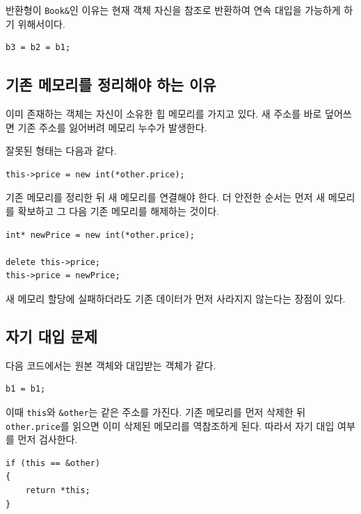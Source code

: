 \documentclass[11pt,a4paper]{article}
\begin{document}
반환형이 \texttt{Book\&}인 이유는 현재 객체 자신을 참조로 반환하여 연속 대입을 가능하게 하기 위해서이다.

\begin{lstlisting}
b3 = b2 = b1;
\end{lstlisting}

\subsection{기존 메모리를 정리해야 하는 이유}
이미 존재하는 객체는 자신이 소유한 힙 메모리를 가지고 있다. 새 주소를 바로 덮어쓰면 기존 주소를 잃어버려 메모리 누수가 발생한다.

잘못된 형태는 다음과 같다.

\begin{lstlisting}
this->price = new int(*other.price);
\end{lstlisting}

기존 메모리를 정리한 뒤 새 메모리를 연결해야 한다. 더 안전한 순서는 먼저 새 메모리를 확보하고 그 다음 기존 메모리를 해제하는 것이다.

\begin{lstlisting}
int* newPrice = new int(*other.price);

delete this->price;
this->price = newPrice;
\end{lstlisting}

새 메모리 할당에 실패하더라도 기존 데이터가 먼저 사라지지 않는다는 장점이 있다.

\subsection{자기 대입 문제}
다음 코드에서는 원본 객체와 대입받는 객체가 같다.

\begin{lstlisting}
b1 = b1;
\end{lstlisting}

이때 \texttt{this}와 \texttt{\&other}는 같은 주소를 가진다. 기존 메모리를 먼저 삭제한 뒤 \texttt{other.price}를 읽으면 이미 삭제된 메모리를 역참조하게 된다. 따라서 자기 대입 여부를 먼저 검사한다.

\begin{lstlisting}
if (this == &other)
{
    return *this;
}
\end{lstlisting}
\end{document}
